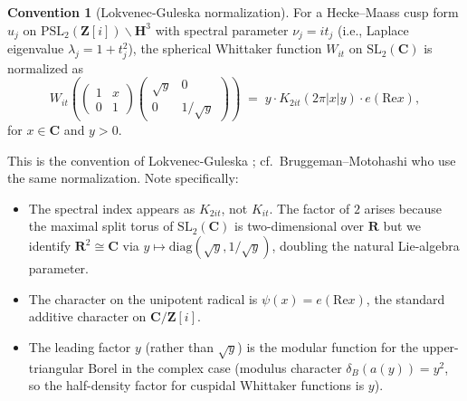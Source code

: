 \documentclass[11pt]{article}
\theoremstyle{definition}
\newtheorem{convention}[theorem]{Convention}
\newcommand{\Z}{\mathbf{Z}}
\newcommand{\R}{\mathbf{R}}
\newcommand{\C}{\mathbf{C}}
\newcommand{\HH}{\mathbf{H}}
\newcommand{\Zi}{\Z[i]}
\renewcommand{\Re}{\mathrm{Re}}
\begin{document}
\begin{convention}[Lokvenec-Guleska normalization]\label{conv:LG}
For a Hecke--Maass cusp form $u_j$ on $\mathrm{PSL}_2(\Zi)\backslash\HH^3$ with spectral parameter $\nu_j = it_j$ (i.e., Laplace eigenvalue $\lambda_j = 1+t_j^2$), the spherical Whittaker function $W_{it}$ on $\mathrm{SL}_2(\C)$ is normalized as
\begin{equation}\label{eq:whittaker-LG}
    W_{it}\!\left(\begin{pmatrix}1 & x \\ 0 & 1\end{pmatrix}\begin{pmatrix}\sqrt y & 0 \\ 0 & 1/\sqrt y\end{pmatrix}\right) \;=\; y \cdot K_{2it}(2\pi |x| y) \cdot e(\Re x),
\end{equation}
for $x \in \C$ and $y > 0$.
\end{convention}

This is the convention of Lokvenec-Guleska \cite[Ch.~3, eq.~(3.12)]{LG}; cf.\ Bruggeman--Motohashi \cite[\S 5]{BM} who use the same normalization. Note specifically:
\begin{itemize}
    \item The spectral index appears as $K_{2it}$, not $K_{it}$. The factor of $2$ arises because the maximal split torus of $\mathrm{SL}_2(\C)$ is two-dimensional over $\R$ but we identify $\R^2 \cong \C$ via $y \mapsto \mathrm{diag}(\sqrt y, 1/\sqrt y)$, doubling the natural Lie-algebra parameter.
    \item The character on the unipotent radical is $\psi(x) = e(\Re x)$, the standard additive character on $\C/\Zi$.
    \item The leading factor $y$ (rather than $\sqrt y$) is the modular function for the upper-triangular Borel in the complex case (modulus character $\delta_B(a(y)) = y^2$, so the half-density factor for cuspidal Whittaker functions is $y$).
\end{itemize}
\end{document}
